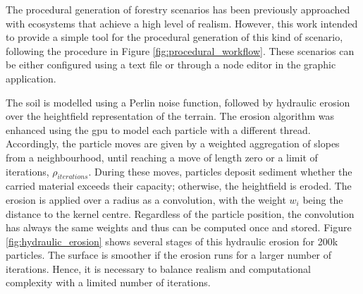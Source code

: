The procedural generation of forestry scenarios has been previously approached with ecosystems \cite{cordonnier_authoring_2017, fischer_autobiomes_2020, makowski_synthetic_2019} that achieve a high level of realism. However, this work intended to provide a simple tool for the procedural generation of this kind of scenario, following the procedure in Figure \ref{fig:procedural_workflow}. These scenarios can be either configured using a text file or through a node editor in the graphic application.

The soil is modelled using a Perlin noise function, followed by hydraulic erosion over the heightfield representation of the terrain. The erosion algorithm was enhanced using the \acrshort{gpu} to model each particle with a different thread. Accordingly, the particle moves are given by a weighted aggregation of slopes from a neighbourhood, until reaching a move of length zero or a limit of iterations, $\rho_{\textit{iterations}}$. During these moves, particles deposit sediment whether the carried material exceeds their capacity; otherwise, the heightfield is eroded. The erosion is applied over a radius as a convolution, with the weight $w_i$ being the distance to the kernel centre. Regardless of the particle position, the convolution has always the same weights and thus can be computed once and stored. Figure \ref{fig:hydraulic_erosion} shows several stages of this hydraulic erosion for 200k particles. The surface is smoother if the erosion runs for a larger number of iterations. Hence, it is necessary to balance realism and computational complexity with a limited number of iterations. 

